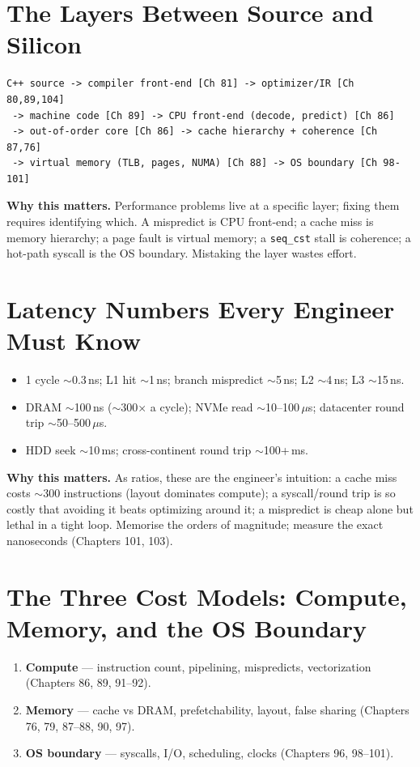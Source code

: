 \section{The Layers Between Source and Silicon}
\begin{lstlisting}[language=text, caption={The transformation stack; each layer can make identical source perform differently.}]
C++ source -> compiler front-end [Ch 81] -> optimizer/IR [Ch 80,89,104]
 -> machine code [Ch 89] -> CPU front-end (decode, predict) [Ch 86]
 -> out-of-order core [Ch 86] -> cache hierarchy + coherence [Ch 87,76]
 -> virtual memory (TLB, pages, NUMA) [Ch 88] -> OS boundary [Ch 98-101]
\end{lstlisting}

\textbf{Why this matters.} Performance problems live at a specific layer; fixing them requires identifying which. A mispredict is CPU front-end; a cache miss is memory hierarchy; a page fault is virtual memory; a \texttt{seq\_cst} stall is coherence; a hot-path syscall is the OS boundary. Mistaking the layer wastes effort.

\section{Latency Numbers Every Engineer Must Know}
\begin{itemize}
\item 1 cycle $\sim$0.3\,ns; L1 hit $\sim$1\,ns; branch mispredict $\sim$5\,ns; L2 $\sim$4\,ns; L3 $\sim$15\,ns.
\item DRAM $\sim$100\,ns ($\sim$300$\times$ a cycle); NVMe read $\sim$10--100\,$\mu$s; datacenter round trip $\sim$50--500\,$\mu$s.
\item HDD seek $\sim$10\,ms; cross-continent round trip $\sim$100+\,ms.
\end{itemize}

\textbf{Why this matters.} As ratios, these are the engineer's intuition: a cache miss costs $\sim$300 instructions (layout dominates compute); a syscall/round trip is so costly that avoiding it beats optimizing around it; a mispredict is cheap alone but lethal in a tight loop. Memorise the orders of magnitude; measure the exact nanoseconds (Chapters 101, 103).

\section{The Three Cost Models: Compute, Memory, and the OS Boundary}
\begin{enumerate}
\item \textbf{Compute} --- instruction count, pipelining, mispredicts, vectorization (Chapters 86, 89, 91--92).
\item \textbf{Memory} --- cache vs DRAM, prefetchability, layout, false sharing (Chapters 76, 79, 87--88, 90, 97).
\item \textbf{OS boundary} --- syscalls, I/O, scheduling, clocks (Chapters 96, 98--101).
\end{enumerate}

